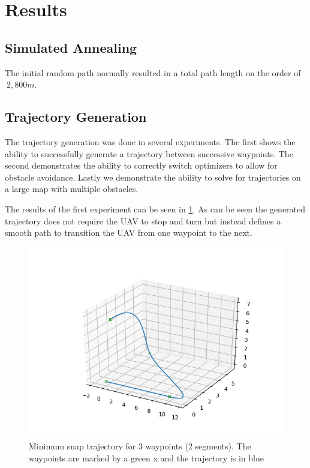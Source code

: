\documentclass[letterpaper,conference, 10pt]{ieeeconf}
\begin{document}
\section{Results}
\label{section:results}


\subsection{Simulated Annealing}
The initial random path normally resulted in a total path length on the order of $~2,800 m$. 

\subsection{Trajectory Generation}

The trajectory generation was done in several experiments. The first shows the ability to successfully generate a trajectory between successive waypoints. The second demonstrates the ability to correctly switch optimizers to allow for obstacle avoidance. Lastly we demonstrate the ability to solve for trajectories on a large map with multiple obstacles.

The results of the first experiment can be seen in \cref{fig:optimal_traj}. As can be seen the generated trajectory does not require the UAV to stop and turn but instead defines a smooth path to transition the UAV from one waypoint to the next.
\begin{figure}[bth]
    \centering
    \includegraphics[scale=0.5]{traj.png}
    \caption{Minimum snap trajectory for 3 waypoints (2 segments). The waypoints are marked by a green x and the trajectory is in blue}
    \label{fig:optimal_traj}
\end{figure}
\end{document}
